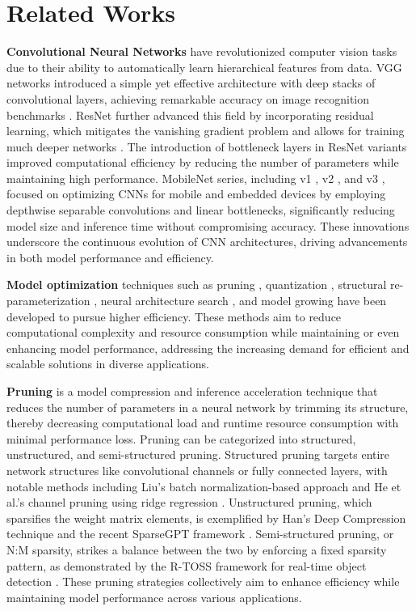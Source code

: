\documentclass[preprint,12pt]{elsarticle}
\begin{document}
\section{Related Works}
\label{related_works}

\textbf{Convolutional Neural Networks} \cite{cnn} have revolutionized computer vision tasks due to their ability to automatically learn hierarchical features from data. VGG networks introduced a simple yet effective architecture with deep stacks of convolutional layers, achieving remarkable accuracy on image recognition benchmarks \cite{vgg}. ResNet further advanced this field by incorporating residual learning, which mitigates the vanishing gradient problem and allows for training much deeper networks \cite{resnet}. The introduction of bottleneck layers in ResNet variants improved computational efficiency by reducing the number of parameters while maintaining high performance. MobileNet series, including v1 \cite{mobilenet1}, v2 \cite{mobilenet2}, and v3 \cite{mobilenet3}, focused on optimizing CNNs for mobile and embedded devices by employing depthwise separable convolutions and linear bottlenecks, significantly reducing model size and inference time without compromising accuracy. These innovations underscore the continuous evolution of CNN architectures, driving advancements in both model performance and efficiency.

\textbf{Model optimization} techniques such as pruning \cite{pruning}, quantization \cite{quantization}, structural re-parameterization \cite{acnet}, neural architecture search \cite{nas}, and model growing \cite{autogrow} have been developed to pursue higher efficiency. These methods aim to reduce computational complexity and resource consumption while maintaining or even enhancing model performance, addressing the increasing demand for efficient and scalable solutions in diverse applications.

\textbf{Pruning} \cite{pruning} is a model compression and inference acceleration technique that reduces the number of parameters in a neural network by trimming its structure, thereby decreasing computational load and runtime resource consumption with minimal performance loss. Pruning can be categorized into structured, unstructured, and semi-structured pruning. Structured pruning targets entire network structures like convolutional channels or fully connected layers, with notable methods including Liu's batch normalization-based approach \cite{bnpruning} and He et al.'s channel pruning using ridge regression \cite{channelpruning}. Unstructured pruning, which sparsifies the weight matrix elements, is exemplified by Han's Deep Compression technique \cite{deepc} and the recent SparseGPT framework \cite{sparsegpt}. Semi-structured pruning, or N:M sparsity, strikes a balance between the two by enforcing a fixed sparsity pattern, as demonstrated by the R-TOSS framework for real-time object detection \cite{RTOSS}. These pruning strategies collectively aim to enhance efficiency while maintaining model performance across various applications.
\end{document}
